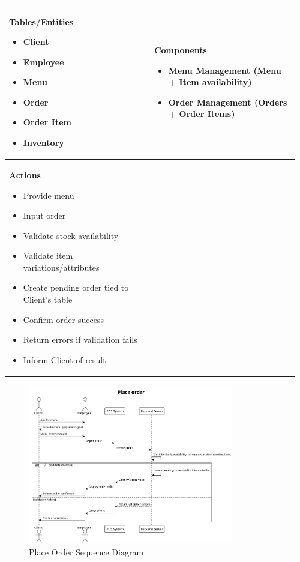 \documentclass[]{VUMIFTemplateClass}
\newenvironment{mpitemlist}[1][\linewidth]{%
    \begin{minipage}[t]{#1}%
        \setlength{\leftmargini}{12pt}%
        \begin{itemize}%
            \setlength{\itemsep}{1pt}%
            \setlength{\parskip}{0pt}%
            \setlength{\parsep}{0pt}%
}{%
        \end{itemize}%
    \end{minipage}\newline
}
\begin{document}
\begin{center}
\setlength{\tabcolsep}{8pt}
\begin{tabular}{|p{0.48\linewidth}|p{0.48\linewidth}|}
\hline
\textbf{Tables/Entities} \newline
\begin{mpitemlist}
\item Client
\item Employee
\item Menu
\item Order
\item Order Item
\item Inventory
\end{mpitemlist}
&
\textbf{Components} \newline
\begin{mpitemlist}
\item Menu Management (Menu + Item availability)
\item Order Management (Orders + Order Items)
\end{mpitemlist}
\\ \hline
\textbf{Actions} \newline
\begin{mpitemlist}
\item Provide menu
\item Input order
\item Validate stock availability
\item Validate item variations/attributes
\item Create pending order tied to Client’s table
\item Confirm order success
\item Return errors if validation fails
\item Inform Client of result
\end{mpitemlist}
&

\\ \hline
\end{tabular}
\end{center}

\begin{figure}[H]
    \centering
    \includegraphics[width=0.8\textwidth]{images/diagrams/orders/order_place_order_sequence.png}
    \caption{Place Order Sequence Diagram}
    \label{fig:place_order_sequence}
\end{figure}
\end{document}
